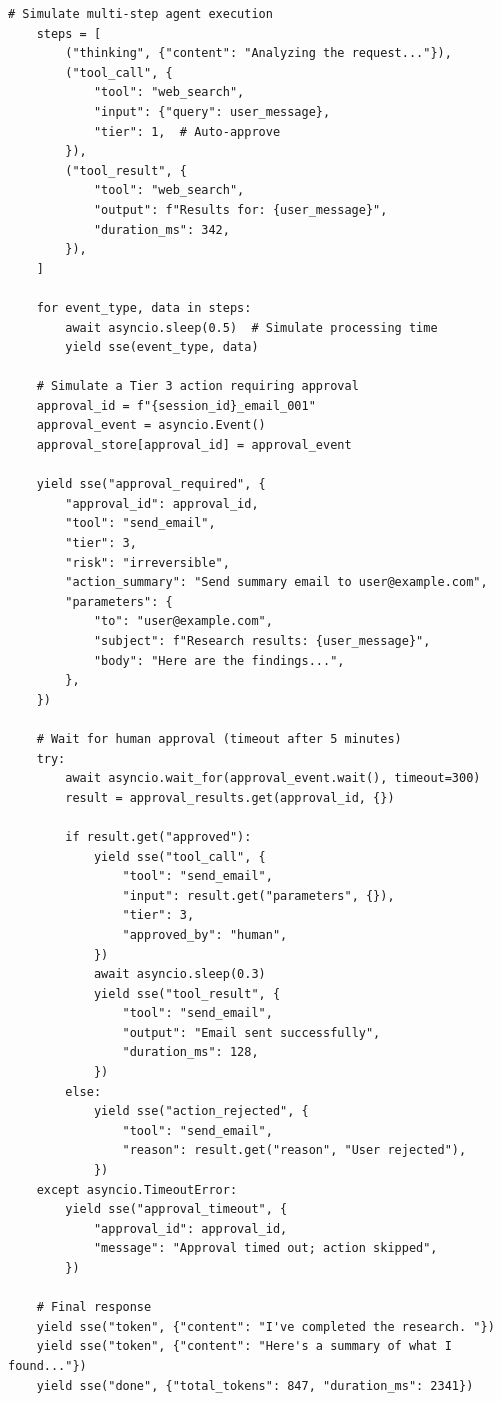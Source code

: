 \begin{lstlisting}[style=pythonstyle, caption={FastAPI backend with streaming and approval gates}]
    # Simulate multi-step agent execution
    steps = [
        ("thinking", {"content": "Analyzing the request..."}),
        ("tool_call", {
            "tool": "web_search",
            "input": {"query": user_message},
            "tier": 1,  # Auto-approve
        }),
        ("tool_result", {
            "tool": "web_search",
            "output": f"Results for: {user_message}",
            "duration_ms": 342,
        }),
    ]

    for event_type, data in steps:
        await asyncio.sleep(0.5)  # Simulate processing time
        yield sse(event_type, data)

    # Simulate a Tier 3 action requiring approval
    approval_id = f"{session_id}_email_001"
    approval_event = asyncio.Event()
    approval_store[approval_id] = approval_event

    yield sse("approval_required", {
        "approval_id": approval_id,
        "tool": "send_email",
        "tier": 3,
        "risk": "irreversible",
        "action_summary": "Send summary email to user@example.com",
        "parameters": {
            "to": "user@example.com",
            "subject": f"Research results: {user_message}",
            "body": "Here are the findings...",
        },
    })

    # Wait for human approval (timeout after 5 minutes)
    try:
        await asyncio.wait_for(approval_event.wait(), timeout=300)
        result = approval_results.get(approval_id, {})

        if result.get("approved"):
            yield sse("tool_call", {
                "tool": "send_email",
                "input": result.get("parameters", {}),
                "tier": 3,
                "approved_by": "human",
            })
            await asyncio.sleep(0.3)
            yield sse("tool_result", {
                "tool": "send_email",
                "output": "Email sent successfully",
                "duration_ms": 128,
            })
        else:
            yield sse("action_rejected", {
                "tool": "send_email",
                "reason": result.get("reason", "User rejected"),
            })
    except asyncio.TimeoutError:
        yield sse("approval_timeout", {
            "approval_id": approval_id,
            "message": "Approval timed out; action skipped",
        })

    # Final response
    yield sse("token", {"content": "I've completed the research. "})
    yield sse("token", {"content": "Here's a summary of what I found..."})
    yield sse("done", {"total_tokens": 847, "duration_ms": 2341})


\end{lstlisting}
